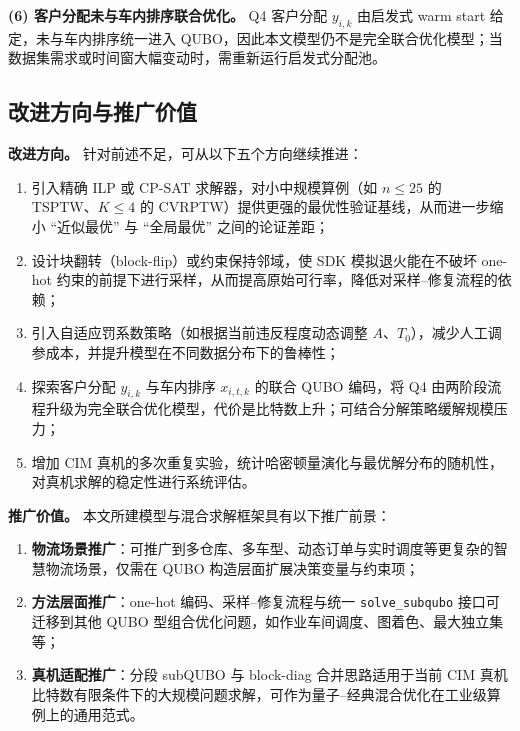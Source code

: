 \documentclass[UTF8,12pt,a4paper]{ctexart}
\begin{document}
\textbf{(6) 客户分配未与车内排序联合优化。} Q4 客户分配 $y_{i,k}$ 由启发式 warm start 给定，未与车内排序统一进入 QUBO，因此本文模型仍不是完全联合优化模型；当数据集需求或时间窗大幅变动时，需重新运行启发式分配池。

\subsection{改进方向与推广价值}

\textbf{改进方向。} 针对前述不足，可从以下五个方向继续推进：

\begin{enumerate}[label=(\arabic*),leftmargin=*]
    \item 引入精确 ILP 或 CP-SAT 求解器，对小中规模算例（如 $n\le 25$ 的 TSPTW、$K\le 4$ 的 CVRPTW）提供更强的最优性验证基线，从而进一步缩小 ``近似最优'' 与 ``全局最优'' 之间的论证差距；
    \item 设计块翻转（block-flip）或约束保持邻域，使 SDK 模拟退火能在不破坏 one-hot 约束的前提下进行采样，从而提高原始可行率，降低对采样--修复流程的依赖；
    \item 引入自适应罚系数策略（如根据当前违反程度动态调整 $A$、$T_0$），减少人工调参成本，并提升模型在不同数据分布下的鲁棒性；
    \item 探索客户分配 $y_{i,k}$ 与车内排序 $x_{i,t,k}$ 的联合 QUBO 编码，将 Q4 由两阶段流程升级为完全联合优化模型，代价是比特数上升；可结合分解策略缓解规模压力；
    \item 增加 CIM 真机的多次重复实验，统计哈密顿量演化与最优解分布的随机性，对真机求解的稳定性进行系统评估。
\end{enumerate}

\textbf{推广价值。} 本文所建模型与混合求解框架具有以下推广前景：

\begin{enumerate}[label=(\arabic*),leftmargin=*]
    \item \textbf{物流场景推广}：可推广到多仓库、多车型、动态订单与实时调度等更复杂的智慧物流场景，仅需在 QUBO 构造层面扩展决策变量与约束项；
    \item \textbf{方法层面推广}：one-hot 编码、采样--修复流程与统一 \texttt{solve\_subqubo} 接口可迁移到其他 QUBO 型组合优化问题，如作业车间调度、图着色、最大独立集等；
    \item \textbf{真机适配推广}：分段 subQUBO 与 block-diag 合并思路适用于当前 CIM 真机比特数有限条件下的大规模问题求解，可作为量子--经典混合优化在工业级算例上的通用范式。
\end{enumerate}
\end{document}
